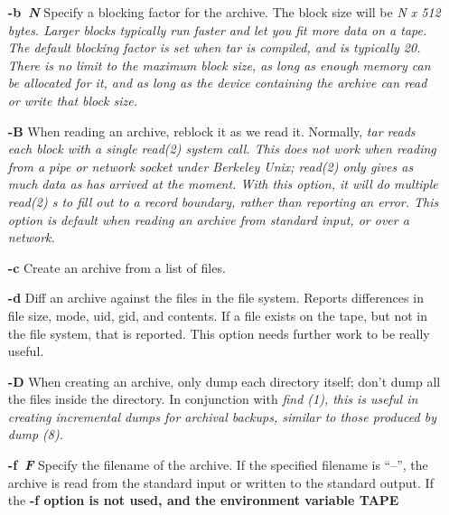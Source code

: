 \begin{itemize}
\item[{\bf -b\rm\ \it N\rm}]
Specify a blocking factor for the archive.  The block size will be
%
\it N \rm%
 x 512 bytes.  Larger blocks typically run faster and let you
fit more data on a tape.  The default blocking factor is set when
%
\it tar \rm%
 is compiled, and is typically 20.  There is no limit to the
maximum block size, as long as enough memory can be allocated for it,
and as long as the device containing the archive can read or write
that block size.
\item[{\bf -B\rm}]
When reading an archive, reblock it as we read it.
Normally, %
\it tar \rm%
 reads each
block with a single %
\it read(2) \rm%
 system call.  This does not work
when reading from a pipe or network socket under Berkeley Unix;
%
\it read(2) \rm%
 only gives as much data as has arrived at the moment.
With this option, it
will do multiple %
\it read(2)\rm%
s to fill out to a record boundary,
rather than reporting an error.
This option is default when reading an archive from standard input,
or over a network.
\item[{\bf -c\rm}]
Create an archive from a list of files.
\item[{\bf -d\rm}]
Diff an archive against the files in the file system.  Reports
differences in file size, mode, uid, gid, and contents.  If a file
exists on the tape, but not in the file system, that is reported.
This option needs further work to be really useful.
\item[{\bf -D\rm}]
When creating an archive, only dump each directory itself; don't dump
all the files inside the directory.  In conjunction with %
\it find\rm%
(1),
this is useful in creating incremental dumps for archival backups,
similar to those produced by %
\it dump\rm%
(8).
\item[{\bf -f\rm\ \it F\rm}]
Specify the filename of the archive.  If the specified filename is ``--'',
the archive is read from the standard input or written to the standard output.
If the %
\bf -f \rm%
 option is not used, and the environment variable %
\bf TAPE \rm%


\end{itemize}
